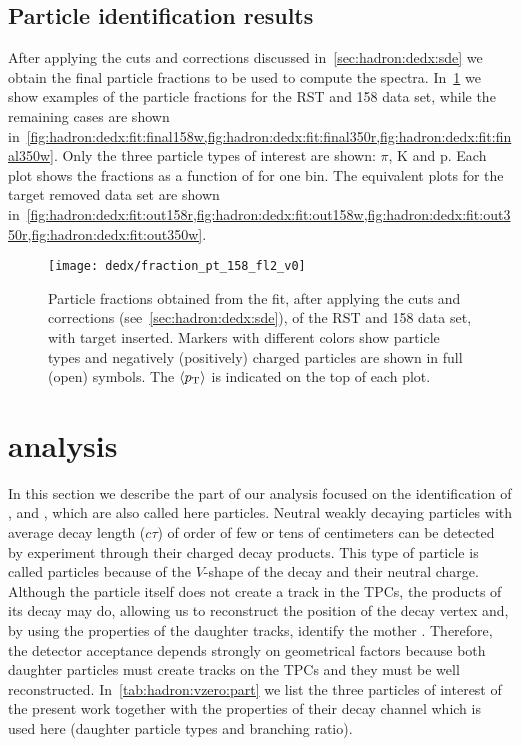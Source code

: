 \subsection{\boldmath Particle identification results}
\label{sec:hadron:dedx:results}

After applying the cuts and corrections discussed
in~\cref{sec:hadron:dedx:sde} we obtain the final
particle fractions to be used to compute the spectra.
In~\cref{fig:hadron:dedx:fit:final158r} we show examples
of the particle fractions for the RST and 158 \GeVc data set,
while the remaining cases are shown 
in~\cref{fig:hadron:dedx:fit:final158w,fig:hadron:dedx:fit:final350r,fig:hadron:dedx:fit:final350w}.
Only the three particle types of interest are shown: $\pi$, $\text{K}$ and $\text{p}$.
Each plot shows the fractions as a function of \pp for one \pT bin.
The equivalent plots for the target removed data set are shown
in~\cref{fig:hadron:dedx:fit:out158r,fig:hadron:dedx:fit:out158w,fig:hadron:dedx:fit:out350r,fig:hadron:dedx:fit:out350w}.

\begin{figure}
  \centering
  \texttt{[image: dedx/fraction\_pt\_158\_fl2\_v0]}
  \caption{Particle fractions obtained from the \dedx fit,
    after applying the cuts and corrections (see~\cref{sec:hadron:dedx:sde}),
    of the RST and 158 \GeVc data set, with target inserted. Markers with different
    colors show particle types and negatively (positively) charged particles are shown
    in full (open) symbols. The $\langle p_\text{T}\rangle$ is indicated on the top of each plot.}
  \label{fig:hadron:dedx:fit:final158r}
\end{figure}

\clearpage

\section[\vzero analysis]{\boldmath \vzero analysis}
\label{sec:hadron:vzero}

In this section we describe the part of our analysis
focused on the identification of \lamb, \antilamb and \kzeros,
which are also called here \vzero particles.
Neutral weakly decaying particles with average decay length ($c\tau$)
of order of few or tens of centimeters can be detected by \NASixtyOne
experiment through their charged decay products. This type of
particle is called \vzero particles because of the $V$-shape of
the decay and their neutral charge. Although the \vzero
particle itself does not create a track in the TPCs, the products
of its decay may do, allowing us to reconstruct the position of the
decay vertex and, by using the properties of the daughter tracks,
identify the mother \vzero. Therefore, the detector acceptance
depends strongly on geometrical factors because both daughter particles
must create tracks on the TPCs and they must be well reconstructed. 
In~\cref{tab:hadron:vzero:part} we list the three \vzero particles of interest
of the present work together with the properties of their decay channel
which is used here (daughter particle types and branching ratio). 

